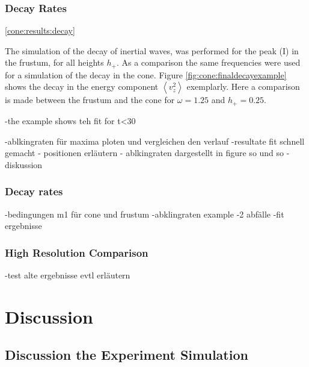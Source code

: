 \subsubsection{Decay Rates}
\ref{cone:results:decay}

The simulation of the decay of inertial waves, was performed for the peak (\RN{1}) in the frustum,
for all heights $h_+$. As a comparison the same frequencies were used for
a simulation of the decay in the cone.
Figure \ref{fig:cone:finaldecayexample} shows the decay in the energy component $\left<v_z^2\right>$ exemplarly.
Here a comparison is made between the frustum and the cone for $\omega=1.25$ and $h_+=0.25$.


-the example shows teh fit for t<30


-ablkingraten für maxima ploten und vergleichen den verlauf
-resultate fit schnell gemacht
- positionen erläutern
- ablkingraten dargestellt in figure so und so
- diskussion

\subsubsection{Decay rates}

-bedingungen m1 für cone und frustum
-abklingraten example
-2 abfälle
-fit ergebnisse

\subsubsection{High Resolution Comparison}

-test alte ergebnisse evtl erläutern

\clearpage

\section{Discussion}
\subsection{Discussion the Experiment Simulation}

